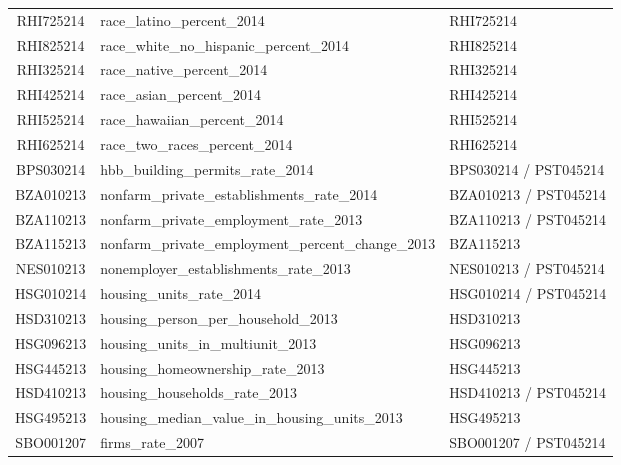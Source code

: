 \begin{landscape}
{\begin{tabularx}{\linewidth}[H]{@{}cXX@{}}
	RHI725214           & race\_latino\_percent\_2014                       & RHI725214                     \\
	RHI825214           & race\_white\_no\_hispanic\_percent\_2014            & RHI825214                     \\
	RHI325214           & race\_native\_percent\_2014                       & RHI325214                     \\
	RHI425214           & race\_asian\_percent\_2014                        & RHI425214                     \\
	RHI525214           & race\_hawaiian\_percent\_2014                     & RHI525214                     \\
	RHI625214           & race\_two\_races\_percent\_2014                    & RHI625214                     \\
	BPS030214           & hbb\_building\_permits\_rate\_2014                 & BPS030214 / PST045214         \\
	BZA010213           & nonfarm\_private\_establishments\_rate\_2014       & BZA010213 / PST045214         \\
	BZA110213           & nonfarm\_private\_employment\_rate\_2013           & BZA110213 / PST045214         \\
	BZA115213           & nonfarm\_private\_employment\_percent\_change\_2013 & BZA115213                     \\
	NES010213           & nonemployer\_establishments\_rate\_2013           & NES010213 / PST045214         \\
	HSG010214           & housing\_units\_rate\_2014                        & HSG010214 / PST045214         \\
	HSD310213           & housing\_person\_per\_household\_2013              & HSD310213                     \\
	HSG096213           & housing\_units\_in\_multiunit\_2013                & HSG096213                     \\
	HSG445213           & housing\_homeownership\_rate\_2013                & HSG445213                     \\
	HSD410213           & housing\_households\_rate\_2013                   & HSD410213 / PST045214         \\
	HSG495213           & housing\_median\_value\_in\_housing\_units\_2013     & HSG495213                     \\
	SBO001207           & firms\_rate\_2007                                & SBO001207 / PST045214         \\

\end{tabularx}}
\end{landscape}
